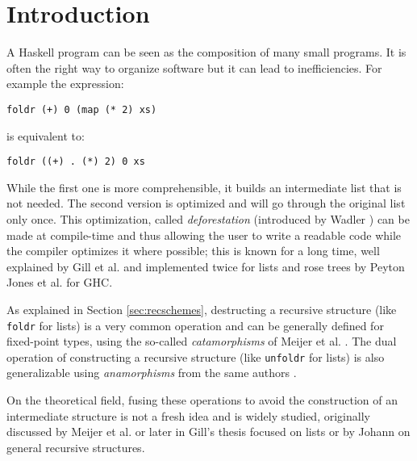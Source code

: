 \documentclass[format=sigplan, review=true, anonymous=true]{acmart}
\newcommand{\hs}[1]{\texttt{#1}}
\begin{document}
\section{Introduction}

A Haskell program can be seen as the composition of many small programs. It is often the right way to organize software but it can lead to inefficiencies. For example the expression:
\begin{verbatim}
foldr (+) 0 (map (* 2) xs)
\end{verbatim}
is equivalent to:
\begin{verbatim}
foldr ((+) . (*) 2) 0 xs
\end{verbatim}

\noindent While the first one is more comprehensible, it builds an intermediate list that is not needed. The second version is optimized and will go through the original list only once.
This optimization, called \emph{deforestation} (introduced by Wadler \cite{WADLER1990231}) can be made at compile-time and thus allowing the user to write a readable code while the compiler optimizes it where possible; this is known for a long time, well explained by Gill et al. \cite{Gill:1993:SCD:165180.165214} and implemented twice for lists and rose trees by Peyton Jones et al. \cite{pbr} for GHC.

As explained in Section \ref{sec:recschemes}, destructing a recursive structure (like \hs{foldr} for lists) is a very common operation and can be generally defined for fixed-point types, using the so-called \emph{catamorphisms} of Meijer et al. \cite{4cec4a43c86444479dc0003182424795}. The dual operation of constructing a recursive structure (like \hs{unfoldr} for lists) is also generalizable using \emph{anamorphisms} from the same authors \cite{4cec4a43c86444479dc0003182424795}.

On the theoretical field, fusing these operations to avoid the construction of an intermediate structure is not a fresh idea and is widely studied, originally discussed by Meijer et al. \cite{4cec4a43c86444479dc0003182424795} or later in Gill's thesis \cite{Gill1996CheapDF} focused on lists or by Johann \cite{Johann:2002:GSF:641433.641471} on general recursive structures.
\end{document}
